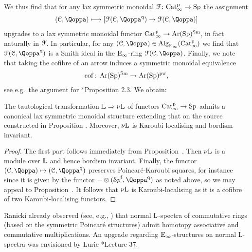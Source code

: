 We thus find that for any lax symmetric monoidal $\mathcal{F} \colon \mathrm{Cat}^{\mathrm p}_\infty \rightarrow \mathrm{Sp}$ the assignment
\[
(\C,\QF) \longmapsto [\F(\C,\QF^\qdr) \rightarrow \F(\C,\QF)]
\]
upgrades to a lax symmetric monoidal functor $\mathrm{Cat}^{\mathrm p}_\infty \rightarrow \operatorname{Ar}(\mathrm{Sp})^{\mathrm{Sm}}$, in fact naturally in $\mathcal{F}$. In particular, for any $(\C,\QF) \in \Alg_{\Einf}(\Catp)$ we find that $\F(\C,\QF^\qdr)$ is a Smith ideal in the ${\mathrm{E}_{\infty}}$-ring $\F(\C,\QF)$. Finally, we note that taking the cofibre of an arrow induces a symmetric monoidal equivalence
\[
\operatorname{cof} \colon \operatorname{Ar}(\mathrm{Sp})^{\mathrm{Sm}} \to \operatorname{Ar}(\mathrm{Sp})^{\mathrm{pw}},
\]
see e.g.\ the argument for \cite{almostpaper}*{Proposition 2.3}.
We obtain:
\begin{corollary}
\label{corollary:normallmult}%
The tautological transformation $\mathbb{L} \Rightarrow {\nu\!\operatorname L}$ of functors $\mathrm{Cat}^{\mathrm p}_\infty \rightarrow \mathrm{Sp}$ admits a canonical lax symmetric monoidal structure extending that on the source constructed in Proposition . Moreover, ${\nu\!\operatorname L}$ is Karoubi-localising and bordism invariant.
\end{corollary}
\begin{proof}
The first part follows immediately from Proposition~. Then ${\nu\!\operatorname L}$ is a module over $\mathbb{L}$ and hence bordism invariant. Finally, the functor $(\C,\QF) \mapsto (\C,\QF^\qdr)$ preserves Poincar\'e-Karoubi squares, for instance since it is given by the functor $- \otimes (\Spaf,\QF^\qdr)$ as noted above, so we may appeal to Proposition~. It follows that ${\nu\!\operatorname L}$ is Karoubi-localising as it is a cofibre of two Karoubi-localising functors.
\end{proof}


Ranicki already observed (see, e.g., \cite{RanickiTSO}) that normal $\operatorname L$-spectra of commutative rings (based on the symmetric Poincar\'e structures) admit homotopy associative and commutative multiplications. An upgrade regarding ${\mathrm{E}_{\infty}}$-structures on normal L-spectra was envisioned by Lurie \cite{Lurie-L-theory}*{Lecture 37}. 




